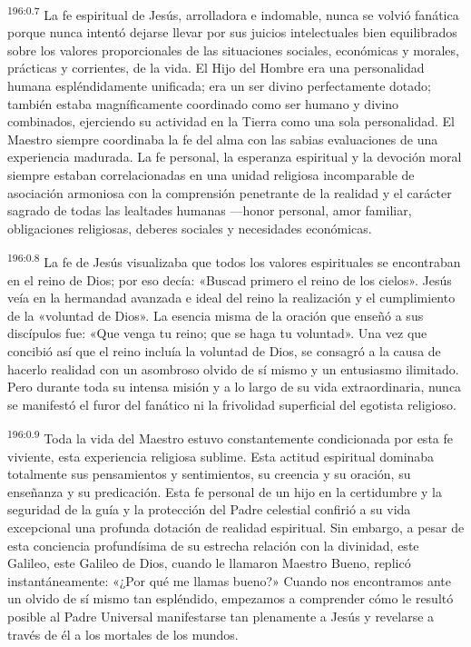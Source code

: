 \par 
\textsuperscript{196:0.7} La fe espiritual de Jesús, arrolladora e indomable, nunca se volvió fanática porque nunca intentó dejarse llevar por sus juicios intelectuales bien equilibrados sobre los valores proporcionales de las situaciones sociales, económicas y morales, prácticas y corrientes, de la vida. El Hijo del Hombre era una personalidad humana espléndidamente unificada; era un ser divino perfectamente dotado; también estaba magníficamente coordinado como ser humano y divino combinados, ejerciendo su actividad en la Tierra como una sola personalidad. El Maestro siempre coordinaba la fe del alma con las sabias evaluaciones de una experiencia madurada. La fe personal, la esperanza espiritual y la devoción moral siempre estaban correlacionadas en una unidad religiosa incomparable de asociación armoniosa con la comprensión penetrante de la realidad y el carácter sagrado de todas las lealtades humanas ---honor personal, amor familiar, obligaciones religiosas, deberes sociales y necesidades económicas.

\par 
\textsuperscript{196:0.8} La fe de Jesús visualizaba que todos los valores espirituales se encontraban en el reino de Dios; por eso decía: «Buscad primero el reino de los cielos». Jesús veía en la hermandad avanzada e ideal del reino la realización y el cumplimiento de la «voluntad de Dios». La esencia misma de la oración que enseñó a sus discípulos fue: «Que venga tu reino; que se haga tu voluntad». Una vez que concibió así que el reino incluía la voluntad de Dios, se consagró a la causa de hacerlo realidad con un asombroso olvido de sí mismo y un entusiasmo ilimitado. Pero durante toda su intensa misión y a lo largo de su vida extraordinaria, nunca se manifestó el furor del fanático ni la frivolidad superficial del egotista religioso.

\par 
\textsuperscript{196:0.9} Toda la vida del Maestro estuvo constantemente condicionada por esta fe viviente, esta experiencia religiosa sublime. Esta actitud espiritual dominaba totalmente sus pensamientos y sentimientos, su creencia y su oración, su enseñanza y su predicación. Esta fe personal de un hijo en la certidumbre y la seguridad de la guía y la protección del Padre celestial confirió a su vida excepcional una profunda dotación de realidad espiritual. Sin embargo, a pesar de esta conciencia profundísima de su estrecha relación con la divinidad, este Galileo, este Galileo de Dios, cuando le llamaron Maestro Bueno, replicó instantáneamente: «¿Por qué me llamas bueno?» Cuando nos encontramos ante un olvido de sí mismo tan espléndido, empezamos a comprender cómo le resultó posible al Padre Universal manifestarse tan plenamente a Jesús y revelarse a través de él a los mortales de los mundos.

